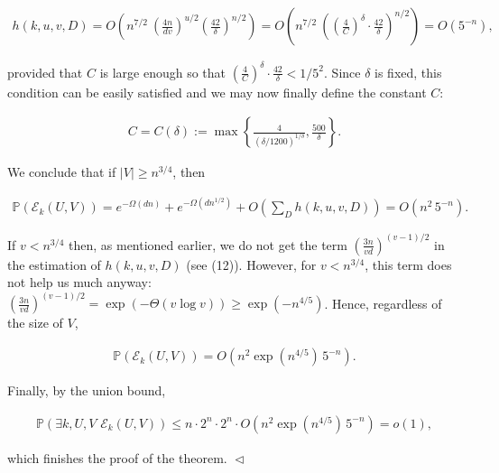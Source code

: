 \[\begin{gathered}
h(k,u,v,D)=O\left(n^{7/2}\ \left(\frac{4n}{dv}\right)^{u/2}\left(\frac{42}{\delta}\right)^{n/2}\right)=O\left(n^{7/2}\ \left(\left(\frac{4}{C}\right)^{\delta}\cdot\frac{42}{\delta}\right)^{n/2}\right)=O\left(5^{-n}\right),
\end{gathered}\]


provided that $C$ is large enough so that
$\left(\frac{4}{C}\right)^{\delta}\cdot\frac{42}{\delta}<1/5^{2}$.
Since $\delta$ is fixed, this condition can be easily satisfied and we may now finally define the constant $C$:\par


\[\begin{gathered}
C=C(\delta):=\max\left\{\frac{4}{(\delta/1200)^{1/\delta}},\frac{500}{\delta}\right\}.
\end{gathered}\]




We conclude that if $|V|\geq n^{3/4}$, then\par


\[\begin{gathered}
\mathbb{P}(\mathcal{E}_{k}(U,V))=e^{-\Omega(dn)}+e^{-\Omega(dn^{1/2})}+O\left(\sum_{D}h(k,u,v,D)\right)=O\left(n^{2}\,5^{-n}\right).
\end{gathered}\]


If $v<n^{3/4}$ then, as mentioned earlier, we do not get the term $\left(\frac{3n}{vd}\right)^{(v-1)/2}$ in the estimation of $h(k,u,v,D)$ (see (12)). However, for $v<n^{3/4}$, this term does not help us much anyway: $\left(\frac{3n}{vd}\right)^{(v-1)/2}=\exp(-\Theta(v\log v))\geq\exp(-n^{4/5})$. Hence, regardless of the size of $V$,\par


\[\begin{gathered}
\mathbb{P}(\mathcal{E}_{k}(U,V))=O\left(n^{2}\exp(n^{4/5})\,5^{-n}\right).
\end{gathered}\]


Finally, by the union bound,\par


\[\begin{gathered}
\mathbb{P}\left(\exists k,U,V\,\,\mathcal{E}_{k}(U,V)\right)\leq n\cdot 2^{n}\cdot 2^{n}\cdot O\left(n^{2}\exp(n^{4/5})\,5^{-n}\right)=o(1),
\end{gathered}\]


which finishes the proof of the theorem.
$\vartriangleleft$\par






